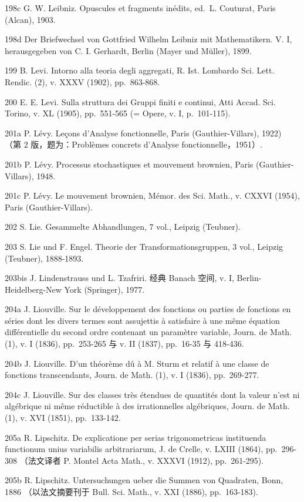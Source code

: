 198c G. W. Leibniz. Opuscules et fragments inédits, ed.~L. Couturat, Paris (Alcan), 1903.

198d Der Briefwechsel von Gottfried Wilhelm Leibniz mit Mathematikern. V. I, herausgegeben von C. I. Gerhardt, Berlin (Mayer und Müller), 1899.

199 B. Levi. Intorno alla teoria degli aggregati, R. Ist. Lombardo Sci. Lett. Rendic. (2), v. XXXV (1902), pp.~863-868.

200 E. E. Levi. Sulla struttura dei Gruppi finiti e continui, Atti Accad. Sci. Torino, v. XL (1905), pp.~551-565 (= Opere, v. I, p.~101-115).

201a P. Lévy. Leçons d'Analyse fonctionnelle, Paris (Gauthier-Villars), 1922) （第 2 版，题为：Problèmes concrets d'Analyse fonctionnelle，1951）.

201b P. Lévy. Processus stochastiques et mouvement brownien, Paris (Gauthier-Villars), 1948.

201c P. Lévy. Le mouvement brownien, Mémor. des Sci. Math., v. CXXVI (1954), Paris (Gauthier-Villars).

202 S. Lie. Gesammelte Abhandlungen, 7 vol., Leipzig (Teubner).

203 S. Lie und F. Engel. Theorie der Transformationsgruppen, 3 vol., Leipzig (Teubner), 1888-1893.

203bis J. Lindenstrauss und L. Tzafriri. 经典 Banach 空间, v. I, Berlin-Heidelberg-New York (Springer), 1977.

204a J. Liouville. Sur le développement des fonctions ou parties de fonctions en séries dont les divers termes sont assujettis à satisfaire à une même équation différentielle du second ordre contenant un paramètre variable, Journ. de Math. (1), v. I (1836), pp.~253-265 与 v. II (1837), pp.~16-35 与 418-436.

204b J. Liouville. D'un théorème dû à M. Sturm et relatif à une classe de fonctions transcendants, Journ. de Math. (1), v. I (1836), pp.~269-277.

204c J. Liouville. Sur des classes très étendues de quantités dont la valeur n'est ni algébrique ni même réductible à des irrationnelles algébriques, Journ. de Math. (1), v. XVI (1851), pp.~133-142.

205a R. Lipschitz. De explicatione per serias trigonometricas instituenda functionum unius variabilis arbitrariarum, J. de Crelle, v. LXIII (1864), pp.~296-308 （法文译者 P. Montel Acta Math., v. XXXVI (1912), pp.~261-295).

205b R. Lipschitz. Untersuchungen ueber die Summen von Quadraten, Bonn, 1886 （以法文摘要刊于 Bull. Sci. Math., v. XXI (1886), pp.~163-183).

